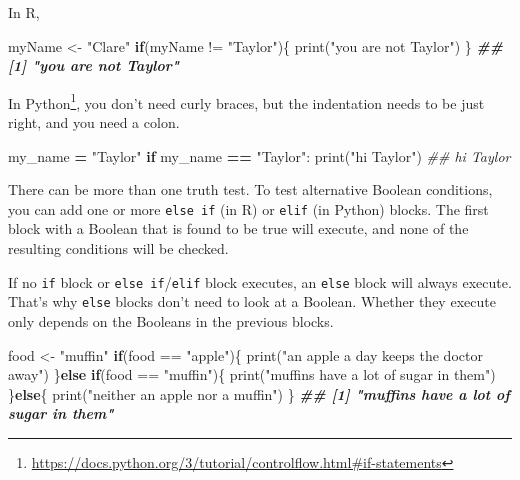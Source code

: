 \documentclass[
  12pt,
]{krantz}
\makeatletter
\newenvironment{Shaded}{\begin{snugshade}}{\end{snugshade}}
\newcommand{\BuiltInTok}[1]{#1}
\newcommand{\CommentTok}[1]{\textcolor[rgb]{0.37,0.37,0.37}{\textit{#1}}}
\newcommand{\ControlFlowTok}[1]{\textcolor[rgb]{0.27,0.27,0.27}{\textbf{#1}}}
\newcommand{\DocumentationTok}[1]{\textcolor[rgb]{0.37,0.37,0.37}{\textbf{\textit{#1}}}}
\newcommand{\FunctionTok}[1]{\textcolor[rgb]{0,0,0}{#1}}
\newcommand{\NormalTok}[1]{#1}
\newcommand{\OperatorTok}[1]{\textcolor[rgb]{0.43,0.43,0.43}{\textbf{#1}}}
\newcommand{\OtherTok}[1]{\textcolor[rgb]{0.37,0.37,0.37}{#1}}
\newcommand{\SpecialCharTok}[1]{\textcolor[rgb]{0,0,0}{#1}}
\newcommand{\StringTok}[1]{\textcolor[rgb]{0.5,0.5,0.5}{#1}}
\renewcommand{\href}[2]{#2\footnote{\url{#1}}}
\newenvironment{kframe}{%
\medskip{}
\setlength{\fboxsep}{.8em}
 \def\at@end@of@kframe{}%
 \ifinner\ifhmode%
  \def\at@end@of@kframe{\end{minipage}}%
  \begin{minipage}{\columnwidth}%
 \fi\fi%
 \def\FrameCommand##1{\hskip\@totalleftmargin \hskip-\fboxsep
 \colorbox{shadecolor}{##1}\hskip-\fboxsep
     \hskip-\linewidth \hskip-\@totalleftmargin \hskip\columnwidth}%
 \MakeFramed {\advance\hsize-\width
   \@totalleftmargin\z@ \linewidth\hsize
   \@setminipage}}%
 {\par\unskip\endMakeFramed%
 \at@end@of@kframe}
\renewenvironment{Shaded}{\begin{kframe}}{\end{kframe}}
\makeatother
\begin{document}
In R,

\begin{Shaded}
\begin{Highlighting}[]
\NormalTok{myName }\OtherTok{\textless{}{-}} \StringTok{"Clare"}
\ControlFlowTok{if}\NormalTok{(myName }\SpecialCharTok{!=} \StringTok{"Taylor"}\NormalTok{)\{}
    \FunctionTok{print}\NormalTok{(}\StringTok{"you are not Taylor"}\NormalTok{)}
\NormalTok{\}}
\DocumentationTok{\#\# [1] "you are not Taylor"}
\end{Highlighting}
\end{Shaded}

\href{https://docs.python.org/3/tutorial/controlflow.html\#if-statements}{In Python}, you don't need curly braces, but the indentation needs to be just right, and you need a colon.

\begin{Shaded}
\begin{Highlighting}[]
\NormalTok{my\_name }\OperatorTok{=} \StringTok{"Taylor"}
\ControlFlowTok{if}\NormalTok{ my\_name }\OperatorTok{==} \StringTok{"Taylor"}\NormalTok{:}
    \BuiltInTok{print}\NormalTok{(}\StringTok{"hi Taylor"}\NormalTok{)}
\CommentTok{\#\# hi Taylor}
\end{Highlighting}
\end{Shaded}

There can be more than one truth test. To test alternative Boolean conditions, you can add one or more \texttt{else\ if} (in R) or \texttt{elif} (in Python) blocks. The first block with a Boolean that is found to be true will execute, and none of the resulting conditions will be checked.

If no \texttt{if} block or \texttt{else\ if}/\texttt{elif} block executes, an \texttt{else} block will always execute. That's why \texttt{else} blocks don't need to look at a Boolean. Whether they execute only depends on the Booleans in the previous blocks.

\begin{Shaded}
\begin{Highlighting}[]
\NormalTok{food }\OtherTok{\textless{}{-}} \StringTok{"muffin"}
\ControlFlowTok{if}\NormalTok{(food }\SpecialCharTok{==} \StringTok{"apple"}\NormalTok{)\{}
    \FunctionTok{print}\NormalTok{(}\StringTok{"an apple a day keeps the doctor away"}\NormalTok{)}
\NormalTok{\}}\ControlFlowTok{else} \ControlFlowTok{if}\NormalTok{(food }\SpecialCharTok{==} \StringTok{"muffin"}\NormalTok{)\{}
    \FunctionTok{print}\NormalTok{(}\StringTok{"muffins have a lot of sugar in them"}\NormalTok{)}
\NormalTok{\}}\ControlFlowTok{else}\NormalTok{\{}
    \FunctionTok{print}\NormalTok{(}\StringTok{"neither an apple nor a muffin"}\NormalTok{)}
\NormalTok{\}}
\DocumentationTok{\#\# [1] "muffins have a lot of sugar in them"}
\end{Highlighting}
\end{Shaded}
\end{document}

